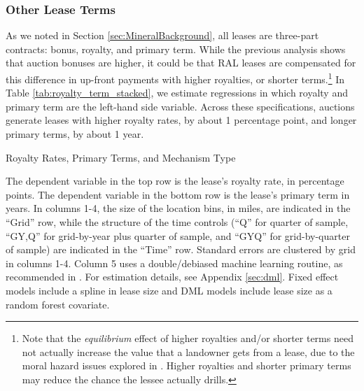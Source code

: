 \subsubsection*{Other Lease Terms \label{subsec:ResultsLeaseChars}}
As we noted in Section \ref{sec:MineralBackground}, all leases are three-part contracts: bonus, royalty, and primary term. While the previous analysis shows that auction bonuses are higher, it could be that RAL leases are compensated for this difference in up-front payments with higher royalties, or shorter terms.\footnote{Note that the \textit{equilibrium} effect of higher royalties and/or shorter terms need not actually increase the value that a landowner gets from a lease, due to the moral hazard issues explored in \cite{herrnstadt}.  Higher royalties and shorter primary terms may reduce the chance the lessee actually drills.} In Table \ref{tab:royalty_term_stacked}, we estimate regressions in which royalty and primary term are the left-hand side variable.  Across these specifications, auctions generate leases with higher royalty rates, by about 1 percentage point, and longer primary terms, by about 1 year.  

\addtolength{\tabcolsep}{4pt}
\begin{table}[htpb]
	\begin{center}
	\begin{threeparttable}
	\caption{Royalty Rates, Primary Terms, and Mechanism Type}
	\label{tab:royalty_term_stacked}
	\small
	            
	\footnotesize
		\begin{tablenotes}
			\item The dependent variable in the top row is the lease's royalty rate, in percentage points.  The dependent variable in the bottom row is the lease's primary term in years. In columns 1-4, the size of the location bins, in miles, are indicated in the ``Grid'' row, while the structure of the time controls (``Q'' for quarter of sample, ``GY,Q'' for grid-by-year plus quarter of sample, and ``GYQ'' for grid-by-quarter of sample) are indicated in the ``Time'' row.  Standard errors are clustered by grid in columns 1-4.  Column 5 uses a double/debiased machine learning routine, as recommended in \cite{chernozhukov2018double}.  For estimation details, see Appendix \ref{sec:dml}.  Fixed effect models include a spline in lease size and DML models include lease size as a random forest covariate.      
		\end{tablenotes}
	\end{threeparttable}
	\end{center}
\end{table}
\addtolength{\tabcolsep}{-2pt}

